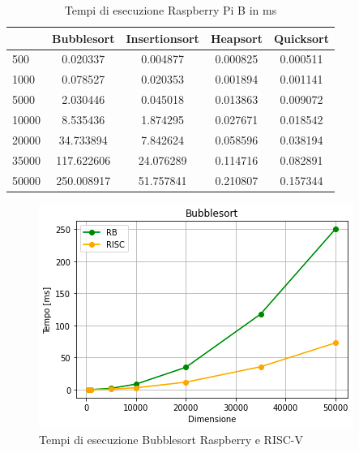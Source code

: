 \documentclass[12pt, a4paper]{report}
\begin{document}
\begin{table}[ht]
		\centering
		\begin{tabular}		{| l | c | c | c | c |}
		\hline
		 & Bubblesort & Insertionsort & Heapsort & Quicksort \\ \hline
500 & 0.020337 & 0.004877 & 0.000825 & 0.000511 \\ \hline
1000 & 0.078527	 & 0.020353 & 0.001894 & 0.001141 \\ \hline
5000 & 2.030446 & 0.045018 & 0.013863 & 0.009072 \\ \hline
10000 & 8.535436 & 1.874295 & 0.027671 & 0.018542 \\ \hline
20000 & 34.733894 & 7.842624 & 0.058596 & 0.038194 \\ \hline
35000 & 117.622606 & 24.076289 & 0.114716 & 0.082891 \\ \hline
50000 & 250.008917 & 51.757841 & 0.210807 & 0.157344 \\ \hline

		\end{tabular}
		\caption{Tempi di esecuzione Raspberry Pi B in ms}
		\label{Tab:RaspSorting}
			\end{table}

\begin{figure}[ht]
\centering
	\includegraphics[scale=0.8]{Bubblesort_RB_RISC.PNG}
	\caption{Tempi di esecuzione Bubblesort Raspberry e RISC-V}
	\label{GrafBubble}
\end{figure}
\end{document}
